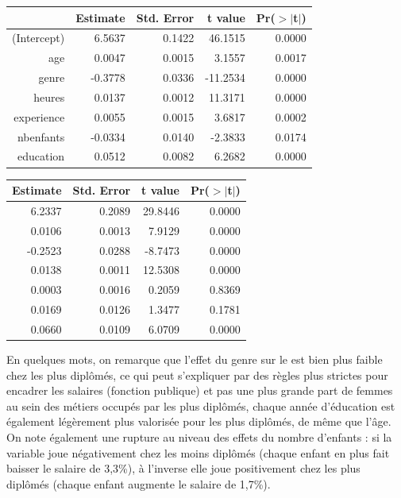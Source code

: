\documentclass[a4paper, french, 11 pt]{article}\usepackage[]{graphicx}\usepackage[]{xcolor}
\begin{document}
\begin{table}[htbp]
   \begin{minipage}[t]{0.4\linewidth}
   {\tiny
      \centering
\begin{tabular}{rrrrr}
  \toprule
 & Estimate & Std. Error & t value & Pr($>$$|$t$|$) \\ 
  \midrule
(Intercept) & 6.5637 & 0.1422 & 46.1515 & 0.0000 \\ 
  age & 0.0047 & 0.0015 & 3.1557 & 0.0017 \\ 
  genre & -0.3778 & 0.0336 & -11.2534 & 0.0000 \\ 
  heures & 0.0137 & 0.0012 & 11.3171 & 0.0000 \\ 
  experience & 0.0055 & 0.0015 & 3.6817 & 0.0002 \\ 
  nbenfants & -0.0334 & 0.0140 & -2.3833 & 0.0174 \\ 
  education & 0.0512 & 0.0082 & 6.2682 & 0.0000 \\ 
   \bottomrule
\end{tabular}}
   \end{minipage}
   \hspace{2cm}
   \begin{minipage}[t]{0.4\linewidth}
   {\tiny
      \centering
\begin{tabular}{rrrr}
  \toprule
Estimate & Std. Error & t value & Pr($>$$|$t$|$) \\ 
  \midrule
6.2337 & 0.2089 & 29.8446 & 0.0000 \\ 
0.0106 & 0.0013 & 7.9129 & 0.0000 \\ 
-0.2523 & 0.0288 & -8.7473 & 0.0000 \\ 
0.0138 & 0.0011 & 12.5308 & 0.0000 \\ 
0.0003 & 0.0016 & 0.2059 & 0.8369 \\ 
0.0169 & 0.0126 & 1.3477 & 0.1781 \\ 
0.0660 & 0.0109 & 6.0709 & 0.0000 \\ 
   \bottomrule
\end{tabular}}
   \end{minipage}
   \hfill
\end{table}

En quelques mots, on remarque que l'effet du genre sur le est bien plus faible chez les plus diplômés, ce qui peut s'expliquer par des règles plus strictes pour encadrer les salaires (fonction publique) et pas une plus grande part de femmes au sein des métiers occupés par les plus diplômés, chaque année d'éducation est également légèrement plus valorisée pour les plus diplômés, de même que l'âge. On note également une rupture au niveau des effets du nombre d'enfants : si la variable joue négativement chez les moins diplômés (chaque enfant en plus fait baisser le salaire de 3,3\%), à l'inverse elle joue positivement chez les plus diplômés (chaque enfant augmente le salaire de 1,7\%).
\end{document}
